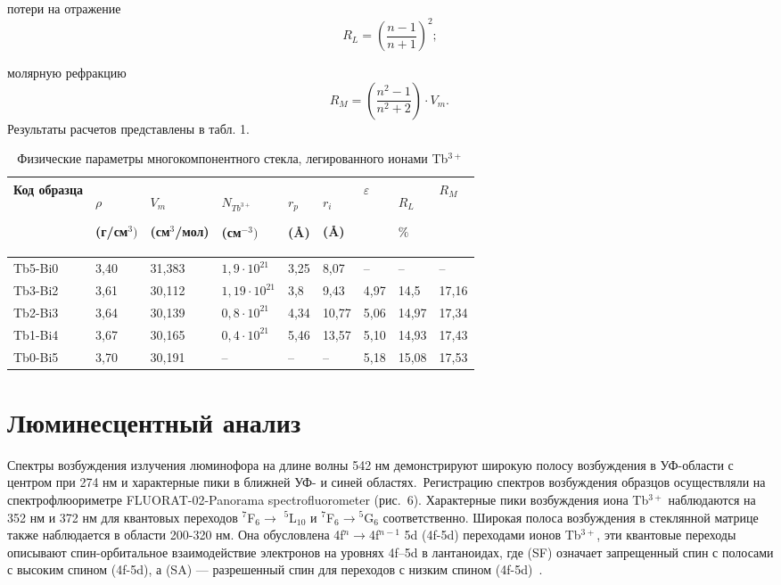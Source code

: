 \documentclass[press]{vestnik}
\begin{document}
\noindent
потери на отражение
\[
R_{L}={\left(\frac{n-1}{n+1}\right)}^{2};
\]

\noindent
молярную рефракцию
\[
R_{M}=\left( \frac{n^{2}-1}{n^{2}+2} \right)\cdot V_{m}.\, 
\]
Результаты расчетов представлены в табл. 1.

\begin{table}
\caption{Физические параметры многокомпонентного стекла, легированного 
ионами Tb$^{3+}$}
\begin{tabularx}{\textwidth}{|Y|Y|Y|Y|Y|Y|P{8mm}|P{8mm}|P{8mm}|}
\hline
Код образца& 
$\rho $ \par (г/см$^{3})$& 
$V_{m}$ \par (см$^{3}$/мол)& 
$N_{{Tb}^{3+}}$ \par (см$^{-3})$& 
$r_{p}$ \par (\AA)& 
$r_{i}$ \par (\AA)& 
$\varepsilon $& 
$R_{L}$ \par $\% $& 
$R_{M}$ \\
\hline
Tb5-Bi0& 
3,40& 
31,383& 
$1,9\cdot 10^{21}$& 
3,25& 
8,07& 
--& 
--& 
-- \\
\hline
Tb3-Bi2& 
3,61& 
30,112& 
$1,19\cdot 10^{21}$& 
3,8& 
9,43& 
4,97& 
14,5& 
17,16 \\
\hline
Tb2-Bi3& 
3,64& 
30,139& 
$0,8\cdot 10^{21}$& 
4,34& 
10,77& 
5,06& 
14,97& 
17,34 \\
\hline
Tb1-Bi4& 
3,67& 
30,165& 
$0,4\cdot 10^{21}$& 
5,46& 
13,57& 
5,10& 
14,93& 
17,43 \\
\hline
Tb0-Bi5& 
3,70& 
30,191& 
--& 
--& 
--& 
5,18& 
15,08& 
17,53 \\
\hline
\end{tabularx}
\label{tab1}
\end{table}

\section{Люминесцентный анализ}

Спектры возбуждения излучения люминофора на длине волны 542 нм демонстрируют 
широкую полосу возбуждения в УФ-области с центром при 274 нм и характерные 
пики в ближней УФ- и синей областях.~Регистрацию спектров возбуждения 
образцов осуществляли на спектрофлюориметре FLUORAT-02-Panorama 
spectrofluorometer (рис.~6). Характерные пики возбуждения иона Tb$^{3+}$ 
наблюдаются на 352 нм и 372 нм для квантовых переходов $^{7}$F$_{6}  \to $ 
$^{5}$L$_{10}$ и $^{7}$F$_{6} \to {}^{5}$G$_{6}$ соответственно. Широкая 
полоса возбуждения в стеклянной матрице также наблюдается в области 200-320 
нм. Она обусловлена 4f$^{n}\to $4f$^{n-1}$ 5d (4f-5d) переходами ионов 
Tb$^{3+}$, эти квантовые переходы описывают спин-орбитальное взаимодействие 
электронов на уровнях 4f--5d в лантаноидах, где (SF) означает запрещенный 
спин с полосами с высоким спином (4f-5d), а (SA) --- разрешенный спин для 
переходов с низким спином (4f-5d)~\cite{B21}.
\end{document}
